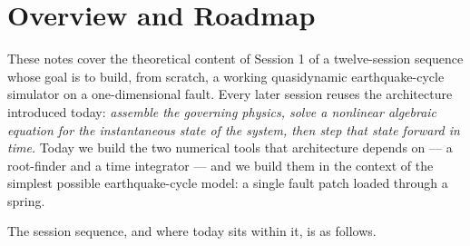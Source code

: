 %
%
%
%
%
%
%
%
%

\section{Overview and Roadmap}

These notes cover the theoretical content of Session 1 of a twelve-session sequence whose goal is to build, from scratch, a working quasidynamic earthquake-cycle simulator on a one-dimensional fault. Every later session reuses the architecture introduced today: \emph{assemble the governing physics, solve a nonlinear algebraic equation for the instantaneous state of the system, then step that state forward in time.} Today we build the two numerical tools that architecture depends on --- a root-finder and a time integrator --- and we build them in the context of the simplest possible earthquake-cycle model: a single fault patch loaded through a spring.

The session sequence, and where today sits within it, is as follows.

